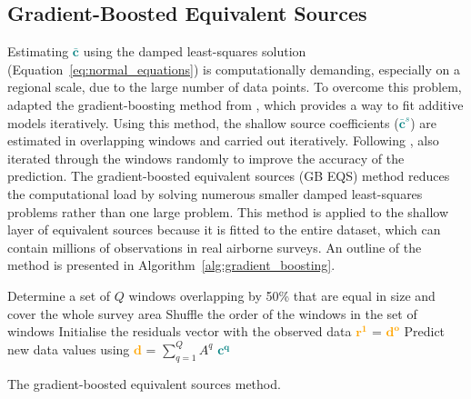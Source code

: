 \subsection{Gradient-Boosted Equivalent Sources}

Estimating \textcolor{teal}{$\bar{\mathbf{c}}$} using the damped least-squares solution (Equation~\ref{eq:normal_equations}) is computationally demanding, especially on a regional scale, due to the large number of data points. 
To overcome this problem, \citet{Soler2021} adapted the gradient-boosting method from \citet{Friedman2001}, which provides a way to fit additive models iteratively. Using this method, the shallow source coefficients (\textcolor{teal}{$\bar{\mathbf{c}}^s$}) are estimated in overlapping windows and carried out iteratively. Following \citet{Friedman2002}, \citet{Soler2021} also iterated through the windows randomly to improve the accuracy of the prediction. 
The gradient-boosted equivalent sources (GB EQS) method reduces the computational load by solving numerous smaller damped least-squares problems rather than one large problem. This method is applied to the shallow layer of equivalent sources because it is fitted to the entire dataset, which can contain millions of observations in real airborne surveys. An outline of the method is presented in Algorithm~\ref{alg:gradient_boosting}.

\begin{algorithm}[!h]
    Determine a set of $Q$ windows overlapping by 50\% that are equal in size and cover the whole survey area
    \;
    Shuffle the order of the windows in the set of windows
    \;
    Initialise the residuals vector with the observed data \textcolor{orange}{$\mathbf{r^1}$} = \textcolor{orange}{$\mathbf{d^o}$}
    \;
    Predict new data values using \textcolor{orange}{$\mathbf{d}$} = $\sum\limits_{q=1}^{Q} A^q$ \textcolor{teal}{$\mathbf{c^q}$}
    \;
    \BlankLine
    \caption{The gradient-boosted equivalent sources method.}
    \label{alg:gradient_boosting}
\end{algorithm}

